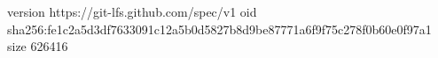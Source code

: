 version https://git-lfs.github.com/spec/v1
oid sha256:fe1c2a5d3df7633091c12a5b0d5827b8d9be87771a6f9f75c278f0b60e0f97a1
size 626416
